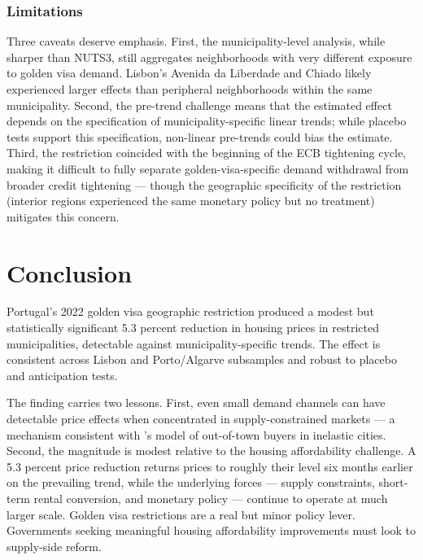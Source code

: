 \documentclass[12pt]{article}
\begin{document}
\subsubsection*{Limitations} Three caveats deserve emphasis. First, the municipality-level analysis, while sharper than NUTS3, still aggregates neighborhoods with very different exposure to golden visa demand. Lisbon's Avenida da Liberdade and Chiado likely experienced larger effects than peripheral neighborhoods within the same municipality. Second, the pre-trend challenge means that the estimated effect depends on the specification of municipality-specific linear trends; while placebo tests support this specification, non-linear pre-trends could bias the estimate. Third, the restriction coincided with the beginning of the ECB tightening cycle, making it difficult to fully separate golden-visa-specific demand withdrawal from broader credit tightening --- though the geographic specificity of the restriction (interior regions experienced the same monetary policy but no treatment) mitigates this concern.

\section{Conclusion}

Portugal's 2022 golden visa geographic restriction produced a modest but statistically significant 5.3 percent reduction in housing prices in restricted municipalities, detectable against municipality-specific trends. The effect is consistent across Lisbon and Porto/Algarve subsamples and robust to placebo and anticipation tests.

The finding carries two lessons. First, even small demand channels can have detectable price effects when concentrated in supply-constrained markets --- a mechanism consistent with \citet{Favilukis2023}'s model of out-of-town buyers in inelastic cities. Second, the magnitude is modest relative to the housing affordability challenge. A 5.3 percent price reduction returns prices to roughly their level six months earlier on the prevailing trend, while the underlying forces --- supply constraints, short-term rental conversion, and monetary policy --- continue to operate at much larger scale. Golden visa restrictions are a real but minor policy lever. Governments seeking meaningful housing affordability improvements must look to supply-side reform.

\label{apep_main_text_end}


\end{document}
